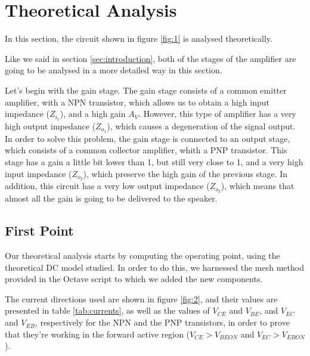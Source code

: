 \section{Theoretical Analysis}
\label{sec:theoretical}

\par In this section, the circuit shown in figure \ref{fig:1} is analysed theoretically.
\par Like we said in section \ref{sec:introduction}, both of the stages of the amplifier are going to be analysed in a more detailed way in this section.
\par Let's begin with the gain stage. The gain stage consists of a common emitter amplifier, with a NPN transistor, which allows us to obtain a high input impedance ($Z_{i_1}$), and a high gain $A_V$. However, this type of amplifier has a very high output impedance ($Z_{o_1}$), which causes a degeneration of the signal output. In order to solve this problem, the gain stage is connected to an output stage, which consists of a common collector amplifier, whith a PNP transistor. This stage has a gain a little bit lower than 1, but still very close to 1, and a very high input impedance ($Z_{o_2}$), which preserve the high gain of the previous stage. In addition, this circuit has a very low output impedance ($Z_{o_2}$), which means that almost all the gain is going to be delivered to the speaker.

\subsection{First Point}

\par Our theoretical analysis starts by computing the operating point, using the theoretical DC model studied. In order to do this, we harnessed the mesh method provided in the Octave script to which we added the new components.
\par The current directions used are shown in figure \ref{fig:2}, and their values are presented in table \ref{tab:currents}, as well as the values of $V_{CE}$ and $V_{BE}$, and $V_{EC}$ and $V_{EB}$, respectively for the NPN and the PNP transistors, in order to prove that they're working in the forward active region ($V_{CE} > V_{BEON}$ and $V_{EC} > V_{EBON}$).


